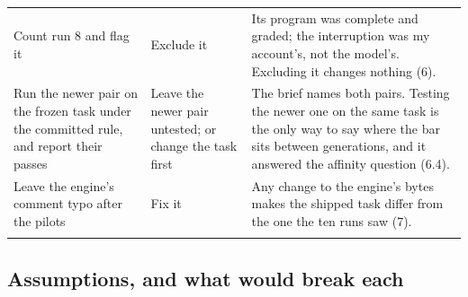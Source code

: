 \documentclass[11pt,letterpaper]{article}
\begin{document}
\begin{small}
\begin{longtable}{>{\raggedright\arraybackslash}p{}>{\raggedright\arraybackslash}p{}>{\raggedright\arraybackslash}p{}}
Count run 8 and flag it & Exclude it & Its program was complete and graded; the interruption was my account's, not the model's. Excluding it changes nothing (6). \\ \addlinespace[2pt]
Run the newer pair on the frozen task under the committed rule, and report their passes & Leave the newer pair untested; or change the task first & The brief names both pairs. Testing the newer one on the same task is the only way to say where the bar sits between generations, and it answered the affinity question (6.4). \\ \addlinespace[2pt]
Leave the engine's comment typo after the pilots & Fix it & Any change to the engine's bytes makes the shipped task differ from the one the ten runs saw (7). \\ \addlinespace[2pt]
\end{longtable}
\end{small}

\subsection{Assumptions, and what would break each}
\end{document}
